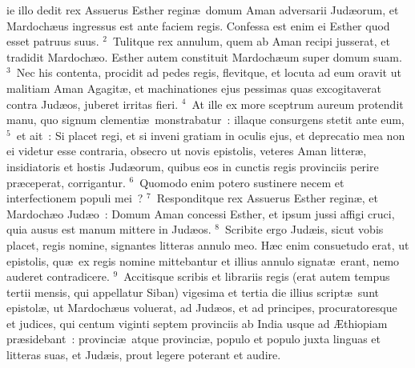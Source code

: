 \bchapter
{}ie illo dedit rex Assuerus Esther regin\ae\ domum Aman adversarii Jud\ae orum, et Mardoch\ae us ingressus est ante faciem regis. Confessa est enim ei Esther quod esset patruus suus.
${}^{2}$~Tulitque rex annulum, quem ab Aman recipi jusserat, et tradidit Mardoch\ae o. Esther autem constituit Mardoch\ae um super domum suam.
${}^{3}$~Nec his contenta, procidit ad pedes regis, flevitque, et locuta ad eum oravit ut malitiam Aman Agagit\ae , et machinationes ejus pessimas quas excogitaverat contra Jud\ae os, juberet irritas fieri.
${}^{4}$~At ille ex more sceptrum aureum protendit manu, quo signum clementi\ae\ monstrabatur~: illaque consurgens stetit ante eum,
${}^{5}$~et ait~: Si placet regi, et si inveni gratiam in oculis ejus, et deprecatio mea non ei videtur esse contraria, obsecro ut novis epistolis, veteres Aman litter\ae , insidiatoris et hostis Jud\ae orum, quibus eos in cunctis regis provinciis perire pr\ae ceperat, corrigantur.
${}^{6}$~Quomodo enim potero sustinere necem et interfectionem populi mei~?
${}^{7}$~Responditque rex Assuerus Esther regin\ae , et Mardoch\ae o Jud\ae o~: Domum Aman concessi Esther, et ipsum jussi affigi cruci, quia ausus est manum mittere in Jud\ae os.
${}^{8}$~Scribite ergo Jud\ae is, sicut vobis placet, regis nomine, signantes litteras annulo meo. H\ae c enim consuetudo erat, ut epistolis, qu\ae\ ex regis nomine mittebantur et illius annulo signat\ae\ erant, nemo auderet contradicere.
${}^{9}$~Accitisque scribis et librariis regis (erat autem tempus tertii mensis, qui appellatur Siban) vigesima et tertia die illius script\ae\ sunt epistol\ae , ut Mardoch\ae us voluerat, ad Jud\ae os, et ad principes, procuratoresque et judices, qui centum viginti septem provinciis ab India usque ad \AE thiopiam pr\ae sidebant~: provinci\ae\ atque provinci\ae , populo et populo juxta linguas et litteras suas, et Jud\ae is, prout legere poterant et audire.


